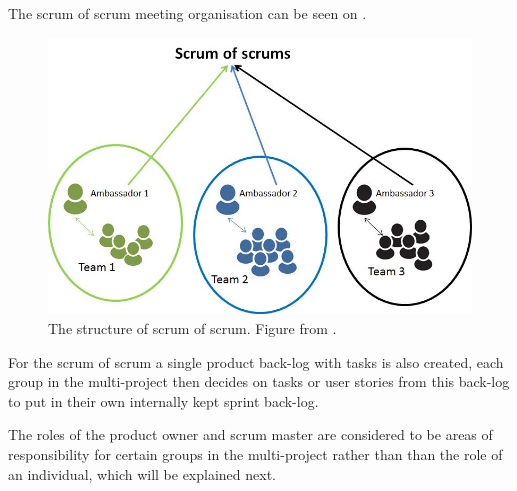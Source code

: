 The scrum of scrum meeting organisation can be seen on .

\begin{figure}
\centering
\includegraphics[scale=0.4]{figures/scrumofscrum.png}
\caption{The structure of scrum of scrum. Figure from \cite{scrumofscrumfigure}.}
\label{fig:scrumofscrum}
\end{figure}

For the scrum of scrum a single product back-log with tasks is also created, each group in the multi-project then decides on tasks or user stories from this back-log to put in their own internally kept sprint back-log.

The roles of the product owner and scrum master are considered to be areas of responsibility for certain groups in the multi-project rather than than the role of an individual, which will be explained next.

